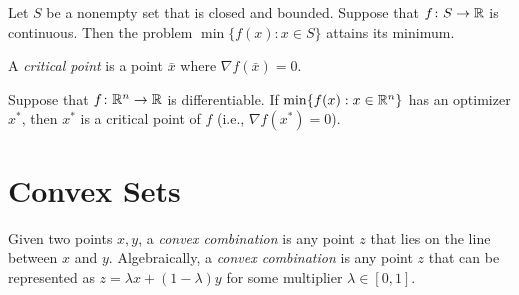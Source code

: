 \documentclass[../open-optimization/open-optimization.tex]{subfiles}
\begin{document}
\begin{theorem}
Let $S$ be a nonempty set that is closed and bounded.  Suppose that $f \colon S \to {\mathbb{R}}$ is continuous.  Then the problem $\min\{ f(x) : x \in S\}$ attains its minimum.
\end{theorem}


\begin{definition}
A \emph{critical point} is a point $\bar x$ where $\nabla f(\bar x) = 0$.
\end{definition}

\begin{theorem}
Suppose that $f\colon {\mathbb{R}}^n \to {\mathbb{R}}$ is differentiable.  If $\min\{ f(x) : x \in {\mathbb{R}}^n\}$ has an optimizer $x^*$, then $x^*$ is a critical point of $f$ (i.e., $\nabla f(x^*) = 0$).
\end{theorem}




\section{Convex Sets}

\begin{definition}
Given two points $x,y$, a \emph{convex combination} is any point $z$ that lies on the line between $x$ and $y$.  Algebraically, a \emph{convex combination} is any point $z$ that can be represented as $z = \lambda x + (	1-\lambda) y $ for some multiplier $\lambda \in [0,1]$.
\end{definition}
\end{document}
